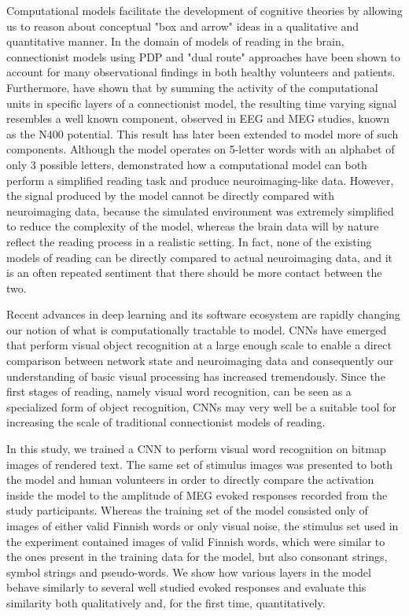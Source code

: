 \documentclass[a4paper, 10pt]{vanvliet_paper}
\begin{document}
Computational models facilitate the development of cognitive theories by allowing us to reason about conceptual "box and arrow" ideas in a qualitative and quantitative manner\cite{Barber2007, Price2018}.
In the domain of models of reading in the brain, connectionist models using \gls{PDP}\cite{McClelland2003} and "dual route" approaches\cite{Perry2007} have been shown to account for many observational findings in both healthy volunteers and patients\cite{McLeod2000, McClelland2003, Perry2007}.
Furthermore, \textcite{Laszlo2012} have shown that by summing the activity of the computational units in specific layers of a connectionist model, the resulting time varying signal resembles a well known component, observed in \gls{EEG} and \gls{MEG} studies, known as the N400 potential\cite{Kutas2011}.
This result has later been extended to model more of such components\cite{Laszlo2014}.
Although the model operates on 5-letter words with an alphabet of only 3 possible letters, \textcite{Laszlo2012} demonstrated how a computational model can both perform a simplified reading task and produce neuroimaging-like data.
However, the signal produced by the model cannot be directly compared with neuroimaging data, because the simulated environment was extremely simplified to reduce the complexity of the model, whereas the brain data will by nature reflect the reading process in a realistic setting.
In fact, none of the existing models of reading can be directly compared to actual neuroimaging data, and it is an often repeated sentiment that there should be more contact between the two\cite{Carreiras2014, Laszlo2012, Laszlo2014, Poeppel2012, Taylor2013}.

Recent advances in deep learning and its software ecosystem are rapidly changing our notion of what is computationally tractable to model\cite{Richards2019}.
\Glspl{CNN} have emerged that perform visual object recognition at a large enough scale to enable a direct comparison between network state and neuroimaging data\cite{Schrimpf2018, Devereux2018, Yamins2016} and consequently our understanding of basic visual processing has increased tremendously\cite{Lindsay2020}.
Since the first stages of reading, namely visual word recognition, can be seen as a specialized form of object recognition, \glspl{CNN} may very well be a suitable tool for increasing the scale of traditional connectionist models of reading.

In this study, we trained a \gls{CNN} to perform visual word recognition on bitmap images of rendered text.
The same set of stimulus images was presented to both the model and human volunteers in order to directly compare the activation inside the model to the amplitude of \gls{MEG} evoked responses recorded from the study participants.
Whereas the training set of the model consisted only of images of either valid Finnish words or only visual noise, the stimulus set used in the experiment contained images of valid Finnish words, which were similar to the ones present in the training data for the model, but also consonant strings, symbol strings and pseudo-words.
We show how various layers in the model behave similarly to several well studied evoked responses and evaluate this similarity both qualitatively and, for the first time, quantitatively.
\end{document}
